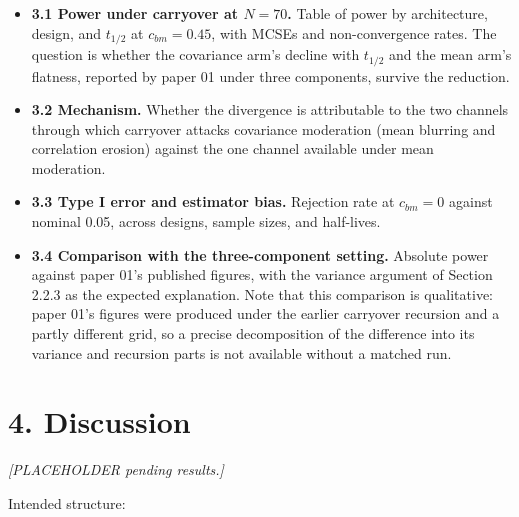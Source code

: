 \documentclass[
  11pt,
]{article}
\begin{document}
\begin{itemize}
\item \textbf{3.1 Power under carryover at $N = 70$.} Table of power
  by architecture, design, and $t_{1/2}$ at $c_{bm} = 0.45$, with
  MCSEs and non-convergence rates. The question is whether the
  covariance arm's decline with $t_{1/2}$ and the mean arm's
  flatness, reported by paper 01 under three components, survive the
  reduction.
\item \textbf{3.2 Mechanism.} Whether the divergence is attributable
  to the two channels through which carryover attacks covariance
  moderation (mean blurring and correlation erosion) against the one
  channel available under mean moderation.
\item \textbf{3.3 Type I error and estimator bias.} Rejection rate at
  $c_{bm} = 0$ against nominal 0.05, across designs, sample sizes,
  and half-lives.
\item \textbf{3.4 Comparison with the three-component setting.}
  Absolute power against paper 01's published figures, with the
  variance argument of Section 2.2.3 as the expected explanation.
  Note that this comparison is qualitative: paper 01's figures were
  produced under the earlier carryover recursion and a partly
  different grid, so a precise decomposition of the difference into
  its variance and recursion parts is not available without a matched
  run.
\end{itemize}

\section{4. Discussion}

\emph{[PLACEHOLDER pending results.]}

Intended structure:
\end{document}
